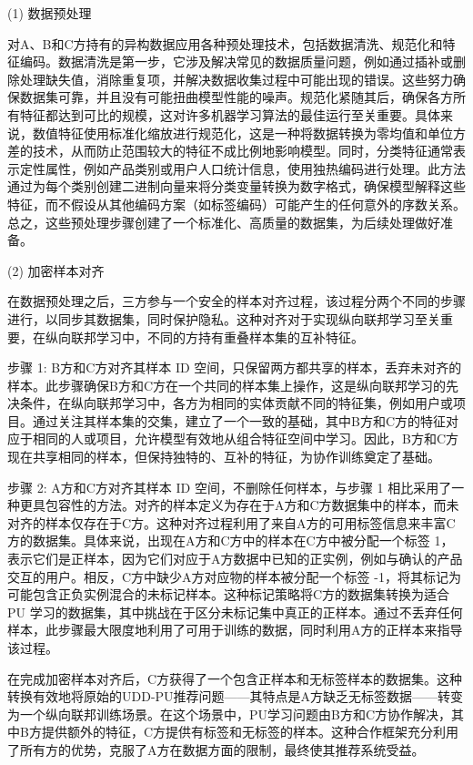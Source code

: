 (1) 数据预处理 
	
对A、B和C方持有的异构数据应用各种预处理技术，包括数据清洗、规范化和特征编码。数据清洗是第一步，它涉及解决常见的数据质量问题，例如通过插补或删除处理缺失值，消除重复项，并解决数据收集过程中可能出现的错误。这些努力确保数据集可靠，并且没有可能扭曲模型性能的噪声。规范化紧随其后，确保各方所有特征都达到可比的规模，这对许多机器学习算法的最佳运行至关重要。具体来说，数值特征使用标准化缩放进行规范化，这是一种将数据转换为零均值和单位方差的技术，从而防止范围较大的特征不成比例地影响模型。同时，分类特征通常表示定性属性，例如产品类别或用户人口统计信息，使用独热编码进行处理。此方法通过为每个类别创建二进制向量来将分类变量转换为数字格式，确保模型解释这些特征，而不假设从其他编码方案（如标签编码）可能产生的任何意外的序数关系。总之，这些预处理步骤创建了一个标准化、高质量的数据集，为后续处理做好准备。
	
(2) 加密样本对齐
	
在数据预处理之后，三方参与一个安全的样本对齐过程，该过程分两个不同的步骤进行，以同步其数据集，同时保护隐私。这种对齐对于实现纵向联邦学习至关重要，在纵向联邦学习中，不同的方持有重叠样本集的互补特征。 
	
步骤 1: B方和C方对齐其样本 ID 空间，只保留两方都共享的样本，丢弃未对齐的样本。此步骤确保B方和C方在一个共同的样本集上操作，这是纵向联邦学习的先决条件，在纵向联邦学习中，各方为相同的实体贡献不同的特征集，例如用户或项目。通过关注其样本集的交集，建立了一个一致的基础，其中B方和C方的特征对应于相同的人或项目，允许模型有效地从组合特征空间中学习。因此，B方和C方现在共享相同的样本，但保持独特的、互补的特征，为协作训练奠定了基础。

步骤 2: A方和C方对齐其样本 ID 空间，不删除任何样本，与步骤 1 相比采用了一种更具包容性的方法。对齐的样本定义为存在于A方和C方数据集中的样本，而未对齐的样本仅存在于C方。这种对齐过程利用了来自A方的可用标签信息来丰富C方的数据集。具体来说，出现在A方和C方中的样本在C方中被分配一个标签 1，表示它们是正样本，因为它们对应于A方数据中已知的正实例，例如与确认的产品交互的用户。相反，C方中缺少A方对应物的样本被分配一个标签 -1，将其标记为可能包含正负实例混合的未标记样本。这种标记策略将C方的数据集转换为适合 PU 学习的数据集，其中挑战在于区分未标记集中真正的正样本。通过不丢弃任何样本，此步骤最大限度地利用了可用于训练的数据，同时利用A方的正样本来指导该过程。

在完成加密样本对齐后，C方获得了一个包含正样本和无标签样本的数据集。这种转换有效地将原始的UDD-PU推荐问题——其特点是A方缺乏无标签数据——转变为一个纵向联邦训练场景。在这个场景中，PU学习问题由B方和C方协作解决，其中B方提供额外的特征，C方提供有标签和无标签的样本。这种合作框架充分利用了所有方的优势，克服了A方在数据方面的限制，最终使其推荐系统受益。


